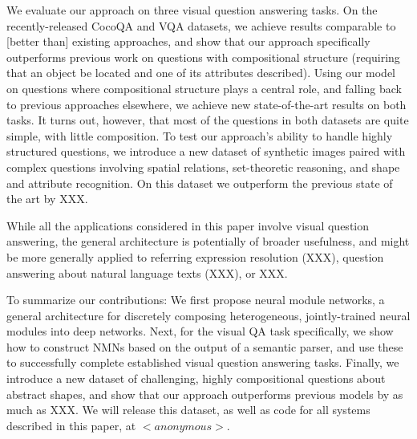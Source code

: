 
We evaluate our approach on three visual question answering tasks. On the
recently-released CocoQA \cite{yu15arxiv} and  VQA \cite{antol15iccv} datasets,
we achieve results comparable to [better than] existing approaches, and show
that our approach specifically outperforms previous work on questions with
compositional structure (\eg requiring that an object be located and one of its
attributes described). Using our model on questions where compositional
structure plays a central role, and falling back to previous approaches
elsewhere, we achieve new state-of-the-art results on both tasks. It turns out,
however, that most of the questions in both datasets are quite simple, with
little composition. To test our approach's ability to handle highly structured
questions, we introduce a new dataset of synthetic images paired with complex
questions involving spatial relations, set-theoretic reasoning, and shape and
attribute recognition. On this dataset we outperform the previous state of the
art by XXX.

While all the applications considered in this paper involve visual question
answering, the general architecture is potentially of broader usefulness, and
might be more generally applied to referring expression resolution (XXX),
question answering about natural language texts (XXX), or XXX.


To summarize our contributions: We first propose neural module networks, a
general architecture for discretely composing heterogeneous, jointly-trained
neural modules into deep networks. Next, for the visual QA task specifically, we
show how to construct NMNs based on the output of a semantic parser, and use
these to successfully complete established visual question answering tasks.
Finally, we introduce a new dataset of challenging, highly compositional
questions about abstract shapes, and show that our approach outperforms previous
models by as much as XXX. We will release this dataset, as well as code for all
systems described in this paper, at $<anonymous>$.
